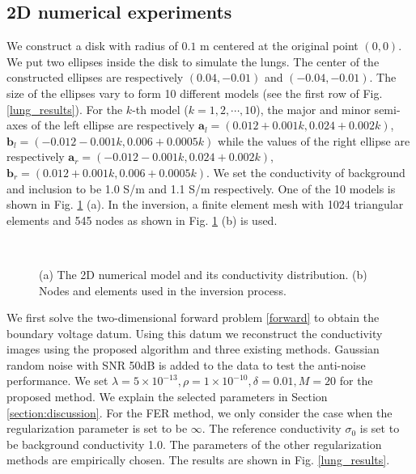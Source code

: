 \documentclass[lettersize,journal]{IEEEtran}
\begin{document}
\subsection{2D numerical experiments}

We construct a disk with radius of $0.1$ m centered at the original point $(0,0)$. We put two ellipses inside the disk to simulate the lungs. The center of the constructed ellipses are respectively $(0.04,-0.01)$ and $(-0.04,-0.01)$. The size of the ellipses vary to form 10 different models (see the first row of Fig. \ref{lung_results}). For the $k$-th model ($k=1,2,\cdots,10$), the major and minor semi-axes of the left ellipse are respectively $\mathbf{a}_l=(0.012+0.001k, 0.024+0.002k)$, $\mathbf{b}_l=(-0.012-0.001k, 0.006+0.0005k)$ while the values of the right ellipse are respectively $\mathbf{a}_r=(-0.012-0.001k, 0.024+0.002k)$, $\mathbf{b}_r=(0.012+0.001k, 0.006+0.0005k)$. We set the conductivity of background and inclusion to be 1.0 S/m and 1.1 S/m respectively. One of the 10 models is shown in Fig. \ref{Numerical_mode_2D} (a). In the inversion, a finite element mesh with 1024 triangular elements and 545 nodes as shown in Fig. \ref{Numerical_mode_2D} (b) is used.

\begin{figure}[htbp]
 \centering
   ~~~~~~

 \caption{(a) The 2D numerical model and its conductivity distribution.  (b) Nodes and elements used in the inversion process.}
\label{Numerical_mode_2D}
\end{figure}

We first solve the two-dimensional forward problem \eqref{forward} to obtain the boundary voltage datum. Using this datum we reconstruct the conductivity images using the proposed algorithm and three existing methods. Gaussian random noise with SNR 50dB is added to the data to test the anti-noise performance.  We set $\lambda=5\times10^{-13},\rho=1\times 10^{-10}, \delta=0.01, M=20$ for the proposed method. We explain the selected parameters in Section \ref{section:discussion}. For the FER method, we only consider the case when the regularization parameter is set to be $\infty$. The reference conductivity $\sigma_0$ is set to be background conductivity 1.0. The parameters of the other regularization methods are empirically chosen.%
The results are shown in Fig. \ref{lung_results}.
\end{document}
